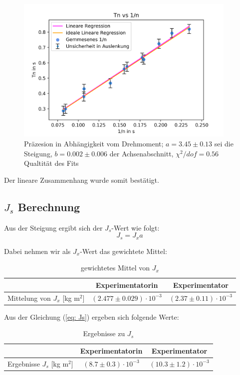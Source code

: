 \documentclass[bibliography=totocnumbered]{scrartcl}
\begin{document}
	
	\newpage
	\begin{figure}[!ht]
		\centering								 
		\includegraphics[width=300pt]{fotos/gpr1/M10_A3_S.png}
		\caption[Präzesion in Abhängigkeit der Kreisdrehzahl]{Präzesion in Abhängigkeit vom Drehmoment; $ a=3.45\pm 0.13 $ sei die Steigung, $ b=0.002\pm 0.006 $ der Achsenabschnitt, $ \chi^{2}/dof=0.56 $ Qualtität des Fits}							 
		\label{Abb: A3 Sara}							 
	\end{figure}
	
	Der lineare Zusammenhang wurde somit bestätigt.
	\subsection{$ J_{s} $ Berechnung}
	
	Aus der Steigung ergibt sich der $ J_{s} $-Wert wie folgt:
	\begin{equation}\label{eq: Js}
		J_{s}=J_{x}a
	\end{equation}

	Dabei nehmen wir als $ J_{x} $-Wert das gewichtete Mittel:
	
	\begin{table}[ht!]
		\centering
		\caption[Mittelung von $ J_{x} $]{gewichtetes Mittel von $ J_{x} $}
		\begin{tabular}{|c|c|c|}
			\hline
			& Experimentatorin & Experimentator \\
			\hline
			Mittelung von  $ J_{x} $ [kg m$ ^{2} $]& $(2.477 \pm0.029)\cdot 10^{-3} $ & $ (2.37\pm0.11)\cdot 10^{-3} $ \\
			\hline
		\end{tabular}
		\label{tab: Jx gemittelt}
	\end{table}
	
	Aus der Gleichung (\ref{eq: Js}) ergeben sich folgende Werte:
	
	\begin{table}[ht!]
		\centering
		\caption{Ergebnisse zu $ J_{s} $}
		\begin{tabular}{|c|c|c|}
			\hline
			& Experimentatorin & Experimentator \\
			\hline
			Ergebnisse $ J_{s} $ [kg m$ ^{2} $]& $(8.7 \pm0.3 )\cdot 10^{-3}$ & $  (10.3 \pm1.2)\cdot 10^{-3} $ \\
			\hline
		\end{tabular}
		\label{tab: Ergebnisse Js}
	\end{table}
	
\end{document}
